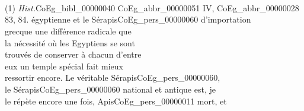 \documentclass{book}
\begin{document}
{\begin{paracol}{2}
\noindent \\
\\
\\
\\
\\
\\
\\
\\
\\
\\
\\
\\
\\
\\
\\
\\
\\
\\
\\
\\
\\
\\
\\
\\
\\
\\
\\
\\
\\
\\
\\
\\
\\
\\
\\
\\
\\
\\
\\
\\
(1) \textit{Hist.}\gls{CoEg_bibl_00000040} \gls{CoEg_abbr_00000051} IV, \gls{CoEg_abbr_00000028} 83, 84.
\switchcolumn
\noindent égyptienne et le Sérapis\gls{CoEg_pers_00000060} d’importation\\
grecque une différence radicale que\\
la nécessité où les Egyptiens se sont\\
trouvés de conserver à chacun d’entre\\
eux un temple spécial fait mieux\\
ressortir encore. Le véritable Sérapis\gls{CoEg_pers_00000060},\\
le Sérapis\gls{CoEg_pers_00000060} national et antique est, je\\
le répète encore une fois, Apis\gls{CoEg_pers_00000011} mort, et\\

\end{paracol}}
\end{document}
